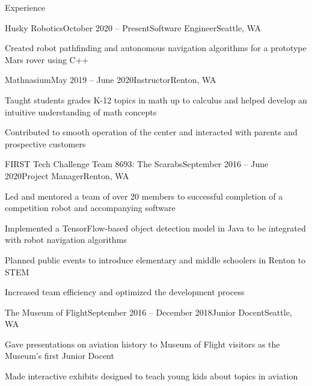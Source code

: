 \documentclass{resume} %
\begin{document}
\begin{rSection}{Experience}

\begin{rSubsection}{Husky Robotics}{October 2020 – Present}{Software Engineer}{Seattle, WA}
\item Created robot pathfinding and autonomous navigation algorithms for a prototype Mars rover using C++
\end{rSubsection}

\begin{rSubsection}{Mathnasium}{May 2019 – June 2020}{Instructor}{Renton, WA}
\item Taught students grades K-12 topics in math up to calculus and helped develop an intuitive understanding of math concepts
\item Contributed to smooth operation of the center and interacted with parents and prospective customers
\end{rSubsection}

\begin{rSubsection}{FIRST Tech Challenge Team 8693: The Scarabs}{September 2016 – June 2020}{Project Manager}{Renton, WA}
\item Led and mentored a team of over 20 members to successful completion of a competition robot and accompanying software
\item Implemented a TensorFlow-based object detection model in Java to be integrated with robot navigation algorithms
\item Planned public events to introduce elementary and middle schoolers in Renton to STEM
\item Increased team efficiency and optimized the development process
\end{rSubsection}

\begin{rSubsection}{The Museum of Flight}{September 2016 – December 2018}{Junior Docent}{Seattle, WA}
\item Gave presentations on aviation history to Museum of Flight visitors as the Museum's first Junior Docent
\item Made interactive exhibits designed to teach young kids about topics in aviation
\end{rSubsection}


\end{rSection}
\end{document}
